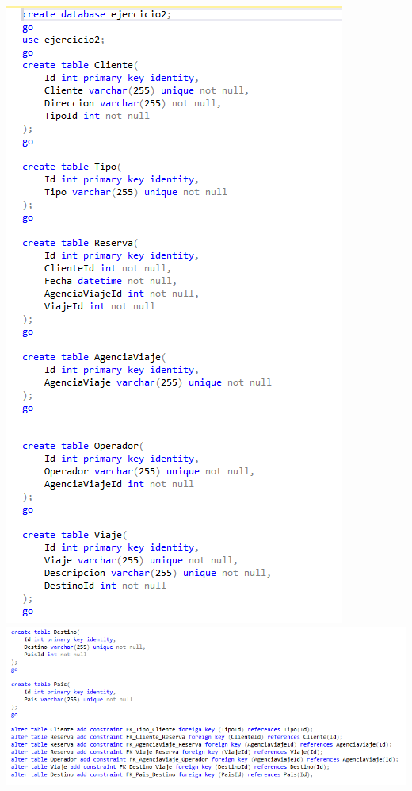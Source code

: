 \documentclass[12pt,letterpaper]{article}
\begin{document}
\begin{center} 
\includegraphics[scale=0.80]{imagenes/a3.png}\\
\includegraphics[width=14cm]{imagenes/a4.png}
\end{center} 
\end{document}
